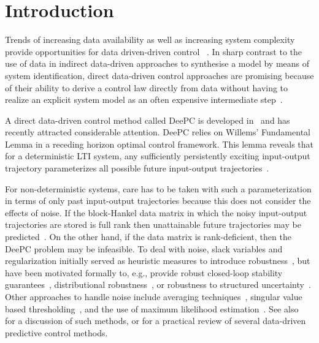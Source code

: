 \section{Introduction}
\noindent Trends of increasing data availability as well as increasing system complexity provide opportunities for data driven-driven control%
~\citep{Hou2013}. In sharp contrast to the use of data in %
indirect data-driven approaches to synthesise a model by means of system identification, direct data-driven control approaches are promising because of their ability to derive a control law directly from data without having to realize an explicit system model as an often expensive intermediate step~\citep{Hjalmarsson2005}.

A direct data-driven control method called \acf{DeePC} is developed in~\cite{Coulson2019} and has recently attracted considerable attention. \ac{DeePC} relies on Willems' Fundamental Lemma in a receding horizon optimal control framework. This lemma reveals that for a deterministic \ac{LTI} system, any sufficiently persistently exciting input-output trajectory parameterizes all possible future input-output trajectories~\citep{Willems2005}.

For non-deterministic systems, care has to be taken with such a parameterization in terms of only past input-output trajectories because this does not consider the effects of noise. If the block-Hankel data matrix in which the noisy input-output trajectories are stored is full rank then unattainable future trajectories may be predicted~\citep{Markovsky2022}. On the other hand, if the data matrix is rank-deficient, then the \ac{DeePC} problem may be infeasible. To deal with noise, slack variables and regularization initially served as heuristic measures to introduce robustness~\citep{Coulson2019}, but have been motivated formally to, e.g., provide robust closed-loop stability guarantees~\citep{Berberich2021}, distributional robustness~\citep{Coulson2019a}, or robustness to structured uncertainty~\citep{Huang2023}. Other approaches to handle noise include averaging techniques~\citep{Jo2022}, singular value based thresholding~\citep{Sassella2022}, and the use of maximum likelihood estimation~\citep{Yin2023}. See also~\cite{Sassella2023} for a discussion of such methods, or \cite{Verheijen2023} for a practical review of several data-driven predictive control methods.%

